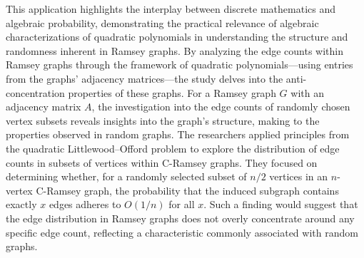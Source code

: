 This application highlights the interplay between discrete
mathematics and algebraic probability, demonstrating the 
practical relevance of algebraic characterizations of 
quadratic polynomials in understanding the structure 
and randomness inherent in Ramsey graphs. 
By analyzing the edge counts within Ramsey graphs 
through the framework of quadratic polynomials—using 
entries from the graphs' adjacency matrices—the study 
delves into the anti-concentration properties of these graphs.
For a Ramsey graph $G$ with an adjacency matrix $A$, 
the investigation into the edge counts of randomly chosen
vertex subsets reveals insights into the graph's structure,
making to the properties observed in random graphs.
The researchers applied principles from the quadratic 
Littlewood–Offord problem to explore the distribution 
of edge counts in subsets of vertices within C-Ramsey graphs.
They focused on determining whether, 
for a randomly selected subset of $n/2$ vertices in an
$n$-vertex C-Ramsey graph, the probability that the induced
subgraph contains exactly $x$ edges adheres to $O(1/n)$ 
for all $x$. Such a finding would suggest that the edge 
distribution in Ramsey graphs does not overly concentrate 
around any specific edge count, reflecting a characteristic
commonly associated with random graphs.
